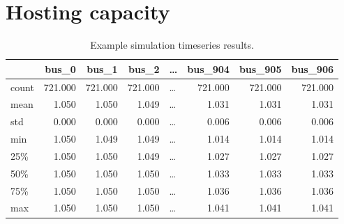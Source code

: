 \documentclass[a4paper,10pt]{report}
\begin{document}
\section{Hosting capacity}

\begin{table}[htpb]
	\centering
	\begin{tabular}{lrrrlrrr}
		\toprule
		& bus\_0 & bus\_1 & bus\_2 & \dots & bus\_904 & bus\_905 & bus\_906 \\
		\midrule
		count & 721.000 & 721.000 & 721.000 & \dots & 721.000 & 721.000 & 721.000 \\
		mean & 1.050 & 1.050 & 1.049 & \dots & 1.031 & 1.031 & 1.031 \\
		std & 0.000 & 0.000 & 0.000 & \dots & 0.006 & 0.006 & 0.006 \\
		min & 1.050 & 1.049 & 1.049 & \dots & 1.014 & 1.014 & 1.014 \\
		25\% & 1.050 & 1.050 & 1.049 & \dots & 1.027 & 1.027 & 1.027 \\
		50\% & 1.050 & 1.050 & 1.050 & \dots & 1.033 & 1.033 & 1.033 \\
		75\% & 1.050 & 1.050 & 1.050 & \dots & 1.036 & 1.036 & 1.036 \\
		max & 1.050 & 1.050 & 1.050 & \dots & 1.041 & 1.041 & 1.041 \\
		\bottomrule
	\end{tabular}
	\caption[Example simulation timeseries results]{Example simulation timeseries results.}
\end{table}
\end{document}
